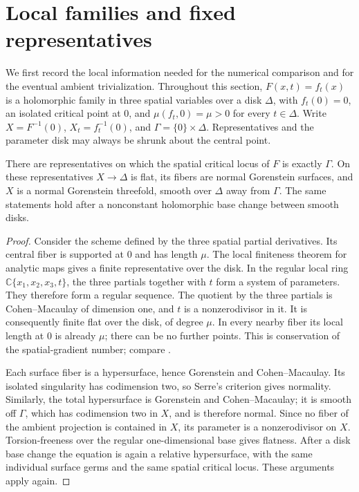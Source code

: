 \section{Local families and fixed representatives}
\label{sec:local-families}

We first record the local information needed for the numerical comparison
and for the eventual ambient trivialization.  Throughout this section,
$F(x,t)=f_t(x)$ is a holomorphic family in three spatial variables over a
disk $\Delta$, with $f_t(0)=0$, an isolated critical point at $0$, and
$\mu(f_t,0)=\mu>0$ for every $t\in\Delta$.  Write
$X=F^{-1}(0)$, $X_t=f_t^{-1}(0)$, and
$\Gamma=\{0\}\times\Delta$.  Representatives and the parameter disk may
always be shrunk about the central point.

\begin{lemma}
\label{lem:local-family-properties}
There are representatives on which the spatial critical locus of $F$ is
exactly $\Gamma$.  On these representatives $X\to\Delta$ is flat, its
fibers are normal Gorenstein surfaces, and $X$ is a normal Gorenstein
threefold, smooth over $\Delta$ away from $\Gamma$.  The same statements
hold after a nonconstant holomorphic base change between smooth disks.
\end{lemma}

\begin{proof}
Consider the scheme defined by the three spatial partial derivatives.
Its central fiber is supported at $0$ and has length $\mu$.  The local
finiteness theorem for analytic maps gives a finite representative over
the disk.  In the regular local ring $\mathbb C\{x_1,x_2,x_3,t\}$, the
three partials together with $t$ form a system of parameters.  They
therefore form a regular sequence.  The quotient by the three partials
is Cohen--Macaulay of dimension one, and $t$ is a nonzerodivisor in it.
It is consequently finite flat over the disk, of degree $\mu$.
In every nearby fiber its local length at $0$ is already $\mu$; there
can be no further points.  This is conservation of the spatial-gradient
number; compare \cite[Proposition~3.1]{Denkowski2018}.

Each surface fiber is a hypersurface, hence Gorenstein and
Cohen--Macaulay.  Its isolated singularity has codimension two, so
Serre's criterion gives normality.  Similarly, the total hypersurface
is Gorenstein and Cohen--Macaulay; it is smooth off $\Gamma$, which has
codimension two in $X$, and is therefore normal.  Since no fiber of the
ambient projection is contained in $X$, its parameter is a
nonzerodivisor on $X$.  Torsion-freeness over the regular one-dimensional
base gives flatness.  After a disk base change the equation is again a
relative hypersurface, with the same individual surface germs and the
same spatial critical locus.  These arguments apply again.
\end{proof}


